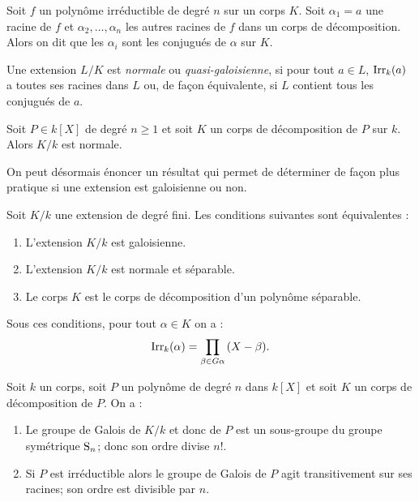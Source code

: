 \documentclass[a4paper]{article} %
\numberwithin{section}{part}
\numberwithin{equation}{section}
\newcommand\Irr[2]{\textup{Irr}_{#1}(#2)}
\begin{document}
Soit $f$ un polynôme irréductible de degré $n$ sur un corps $K$. Soit $\alpha_1 
= a$ une racine de $f$ et $\alpha_2,\dots,\alpha_n$ les autres racines de $f$ 
dans un corps de décomposition. Alors on dit que les $\alpha_i$ sont les 
conjugués de $\alpha$ sur $K$.
\begin{defn}
Une extension $L/K$ est \emph{normale} ou \emph{quasi-galoisienne}, si pour tout
$a\in L$, $\Irr{k}{a}$ a toutes ses racines dans $L$ ou, de façon équivalente,
si $L$ contient tous les conjugués de $a$.
\end{defn}

\begin{prop}
\label{prop:decompnorm}
Soit $P\in k[X]$ de degré $n\geq 1$ et soit $K$ un corps de décomposition de $P$
sur $k$. Alors $K/k$ est normale.
\end{prop}

On peut désormais énoncer un résultat qui permet de déterminer de façon plus
pratique si une extension est galoisienne ou non.

\begin{thm}
Soit $K/k$ une extension de degré fini. Les conditions suivantes sont
équivalentes :
\begin{enumerate}
\item L'extension $K/k$ est galoisienne.
\item L'extension $K/k$ est normale et séparable.
\item Le corps $K$ est le corps de décomposition d'un polynôme séparable.
\end{enumerate}
Sous ces conditions, pour tout $\alpha\in K$ on a :
\begin{equation}
\Irr{k}{\alpha} = \prod_{\beta\in G\alpha}{(X - \beta)}.
\end{equation}
\end{thm}

\begin{thm} Soit $k$ un corps, soit $P$ un polynôme de degré $n$ dans $k[X]$ et
soit $K$ un corps de décomposition de $P$. On a :
\begin{enumerate}
\item Le groupe de Galois de $K/k$ et donc de $P$ est un sous-groupe du groupe
symétrique $\textup{S}_n$; donc son ordre divise $n!$.
\item Si $P$ est irréductible alors le groupe de Galois de $P$ agit
transitivement sur ses racines; son ordre est divisible par $n$.
\end{enumerate}
\end{thm}
\end{document}

